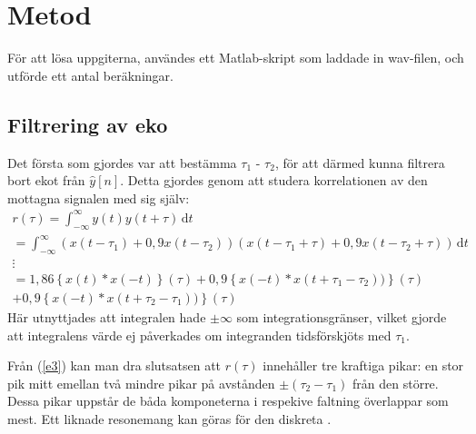 \documentclass[10pt,twocolumn,a4paper]{article}
\begin{document}
\section{Metod}

För att lösa uppgiterna, användes ett Matlab-skript som laddade in wav-filen,
och utförde ett antal beräkningar.
\subsection{Filtrering av eko}

Det första som gjordes var att bestämma $\tau_1$ - $\tau_2$, för att därmed
kunna filtrera bort ekot från $\hat{y}[n]$. Detta gjordes genom att studera korrelationen
av den mottagna signalen med sig själv:
\begin{multline}
    r(\tau) = \int_{-\infty}^{\infty}\!y(t)y(t+\tau)\, \mathrm{d}t \\ 
    = \int_{-\infty}^{\infty}\!(x(t-\tau_1)+0,9 x(t-\tau_2))(x(t-\tau_1+\tau)+0,9 x(t-\tau_2+\tau))\, \mathrm{d}t \\
    \vdots \\
    = 1,86\left\{x(t) \ast x(-t)\right\}(\tau) + 
    0,9\left\{x(-t) \ast x(t+\tau_1-\tau_2))\right\}(\tau)\\ + 
    0,9\left\{x(-t) \ast x(t+\tau_2-\tau_1))\right\}(\tau)
    \label{e3}
\end{multline}
Här utnyttjades att integralen hade $\pm\infty$ som integrationsgränser, vilket gjorde att integralens värde ej
påverkades om integranden tidsförskjöts med $\tau_1$.

Från (\ref{e3}) kan man dra slutsatsen att $r(\tau)$ innehåller tre kraftiga pikar: en stor pik mitt emellan två mindre
pikar på avstånden $\pm(\tau_2 - \tau_1)$ från den större. Dessa pikar uppstår de båda komponeterna i respekive faltning
överlappar som mest. Ett liknade resonemang kan göras för den diskreta \yhat.
\end{document}

